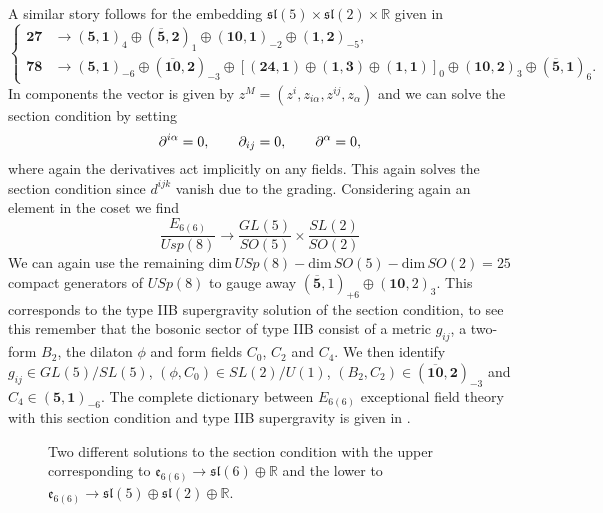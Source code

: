 A similar story follows for the embedding $\mathfrak{sl}(5)\times \mathfrak{sl}(2)\times\mathbb{R}$ given in  
\begin{equation}
    \begin{cases}
        \mathbf{27}&\to (\mathbf{5},\mathbf{1})_{4}\oplus (\overbar{\mathbf{5}},\mathbf{2})_{1}\oplus (\mathbf{10},\mathbf{1})_{-2}\oplus (\mathbf{1},\mathbf{2})_{-5},\\
        \mathbf{78}&\to (\mathbf{5},\mathbf{1})_{-6}\oplus (\overbar{\mathbf{10}},\mathbf{2})_{-3}\oplus [(\mathbf{24},\mathbf{1})\oplus (\mathbf{1},\mathbf{3})\oplus (\mathbf{1},\mathbf{1})]_{0}\oplus (\mathbf{10},\mathbf{2})_{3}\oplus (\overbar{\mathbf{5}},\mathbf{1})_{6}.
    \end{cases}
\end{equation}
In components the vector is given by $z^M=(z^{i},z_{i\alpha},z^{ij},z_{\alpha})$ and we can solve the section condition by setting
\begin{equation}
    \partial^{i\alpha}=0,\qquad \partial_{ij}=0,\qquad \partial^{\alpha} = 0,
\end{equation}
where again the derivatives act implicitly on any fields.  This again solves the section condition since $d^{ijk}$ vanish due to the grading. Considering again an element in the coset we find 
\begin{equation}
    \frac{E_{6(6)}}{Usp(8)}\to \frac{GL(5)}{SO(5)}\times\frac{SL(2)}{SO(2)}
\end{equation}
We can again use the remaining $\text{dim}\, USp(8)-\text{dim}\, SO(5)-\text{dim}\, SO(2)=25$ compact generators of $USp(8)$ to gauge away $(\overbar{\mathbf{5}},1)_{+6}\oplus(\mathbf{10},2)_{3}$. This corresponds to the type IIB supergravity solution of the section condition, to see this remember that the bosonic sector of type IIB consist of a metric $g_{ij}$, a two-form $B_2$, the dilaton $\phi$ and form fields $C_0$, $C_2$ and $C_4$. We then identify $g_{ij}\in GL(5)/SL(5)$, $(\phi,C_0)\in SL(2)/U(1)$, $(B_2,C_2)\in (\overbar{\mathbf{10}},\mathbf{2})_{-3}$ and $C_4\in (\mathbf{5},\mathbf{1})_{-6}$. The complete dictionary between $E_{6(6)}$ exceptional field theory with this section condition and type IIB supergravity is given in \cite{E62014}. 


\begin{figure}
    \centering
    \caption{Two different solutions to the section condition with the upper corresponding to $\mathfrak{e}_{6(6)}\to \mathfrak{sl}(6)\oplus\mathbb{R}$ and the lower to $\mathfrak{e}_{6(6)}\to\mathfrak{sl}(5)\oplus\mathfrak{sl}(2)\oplus\mathbb{R}$.}
    \label{fig:E6Section}
\end{figure}

